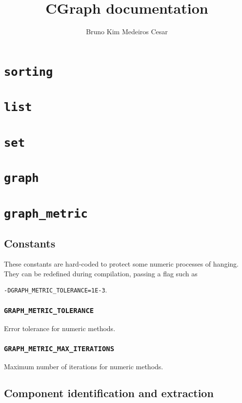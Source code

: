 \documentclass[a4paper,10pt]{article}
\title{CGraph documentation}
\author{Bruno Kim Medeiros Cesar}
\begin{document}
\maketitle

\begin{abstract}
\end{abstract}

\tableofcontents

\section{\texttt{sorting}}
\section{\texttt{list}}
\section{\texttt{set}}
\section{\texttt{graph}}
\section{\texttt{graph\_metric}}

\subsection{Constants}

These constants are hard-coded to protect some numeric processes of hanging.
They can be redefined during compilation, passing a flag such as 

\texttt{-DGRAPH\_METRIC\_TOLERANCE=1E-3}.

\subsubsection{\texttt{GRAPH\_METRIC\_TOLERANCE}}

Error tolerance for numeric methods.

\subsubsection{\texttt{GRAPH\_METRIC\_MAX\_ITERATIONS}}

Maximum number of iterations for numeric methods.

\subsection{Component identification and extraction}
\end{document}
